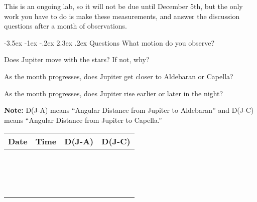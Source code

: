 \documentclass[12pt]{article}
\makeatletter
\renewcommand\section{\@startsection{section}{1}{\z@}%
                                  {-3.5ex \@plus -1ex \@minus -.2ex}%
                                  {2.3ex \@plus.2ex}%
                                  {\normalfont\large\bfseries}}
\makeatother
\begin{document}
This is an ongoing lab, so it will not be due until December 5th, but the only work you have to do is make these measurements, and answer the discussion questions after a month of observations.

\section{Questions}
\noindent What motion do you observe?

\noindent Does Jupiter move with the stars? If not, why?

\noindent As the month progresses, does Jupiter get closer to Aldebaran or Capella?

\noindent As the month progresses, does Jupiter rise earlier or later in the night?

\pagebreak

\textbf{Note:} D(J-A) means ``Angular Distance from Jupiter to Aldebaran'' and D(J-C) means ``Angular Distance from Jupiter to Capella.''

\begin{table}[ht]
\centering
\small\addtolength{\tabcolsep}{24pt}

\begin{tabular}{| c | c | c | c |}
\hline
\textbf{Date} & \textbf{Time} & \textbf{D(J-A)} & \textbf{D(J-C)} \\[0.05in]
\hline
 &   &  &  \\[0.2in]\hline
 &   &  &  \\[0.2in]\hline
 &   &  &  \\[0.2in]\hline
 &   &  &  \\[0.2in]\hline
 &   &  &  \\[0.2in]\hline
 &   &  &  \\[0.2in]\hline
 &   &  &  \\[0.2in]\hline
 &   &  &  \\[0.2in]\hline
 &   &  &  \\[0.2in]\hline
 &   &  &  \\[0.2in]\hline
 &   &  &  \\[0.2in]\hline
 &   &  &  \\[0.2in]\hline
 &   &  &  \\[0.2in]\hline
 &   &  &  \\[0.2in]\hline
 &   &  &  \\[0.2in]\hline
 &   &  &  \\[0.2in]\hline
\end{tabular}
\end{table}
\end{document}
